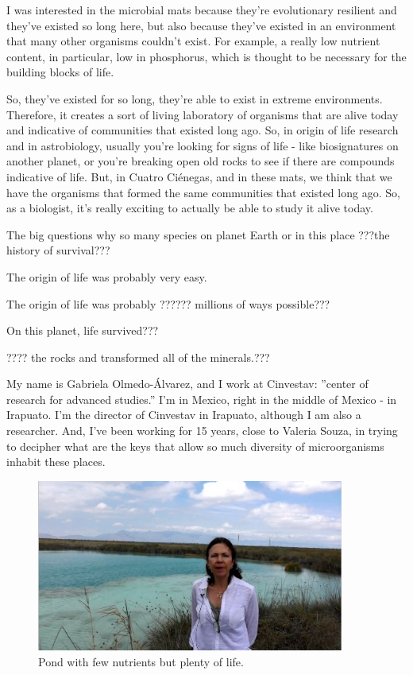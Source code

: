 \documentclass[]{article}
\begin{document}
I was interested in the microbial mats because they're evolutionary resilient
and they've existed so long here, but also because they've existed in an environment that many other organisms couldn't exist. For example, a really low nutrient content, in particular, low in phosphorus, which is thought to be necessary for the building blocks of life.

So, they've existed for so long, they're able to exist in extreme environments. Therefore, it creates a sort of living laboratory of organisms that are alive today and indicative of communities that existed long ago. So, in origin of life research and in astrobiology, usually you're looking for signs of life - like biosignatures on another planet, or you're breaking open old rocks to see if there are compounds
indicative of life. But, in Cuatro  Ci\'enegas, and in these mats, we think that we have the organisms that formed the same communities that existed long ago.  So, as a biologist, it's really exciting to actually be able to study it alive today.

The big questions why so many species on planet Earth or in this place
???the history of survival???

The origin of life was probably very easy.

The origin of life was probably ??????
millions of ways possible???

On this planet, life survived???

???? the rocks
and transformed all of the minerals.???

My name is Gabriela Olmedo-Álvarez, and I work at Cinvestav: ''center of research for advanced studies.'' I'm in Mexico, right in the middle of Mexico - in Irapuato. I'm the director of Cinvestav in Irapuato, although I am also a researcher. And, I've been working for 15 years, close to Valeria Souza, in trying to decipher what are the keys that allow so much diversity of microorganisms inhabit these places.

\begin{figure}[h!]
	\caption{Pond with few nutrients but plenty of life.} 
	\includegraphics[width=0.9\textwidth]{CuatroCienegas4}
\end{figure}
\end{document}

